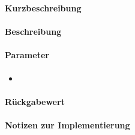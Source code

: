 \subsubsection{}%
\paragraph*{Kurzbeschreibung}

\paragraph*{Beschreibung}

\paragraph*{Parameter}
\begin{itemize}
    \item 
\end{itemize}
\paragraph*{Rückgabewert}

\paragraph*{Notizen zur Implementierung}%
